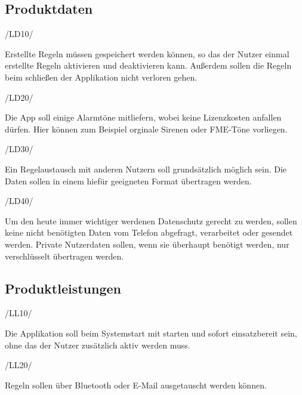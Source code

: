 \subsection{Produktdaten}
\begin{minipage}{3cm}
/LD10/
\end{minipage}
\begin{minipage}{13cm}
Erstellte Regeln m\"ussen gespeichert werden k\"onnen, so das der Nutzer einmal erstellte Regeln aktivieren und deaktivieren kann. Au\ss{}erdem sollen die Regeln beim schlie\ss{}en der Applikation nicht verloren gehen.\\
\end{minipage}
\begin{minipage}{3cm}
/LD20/
\end{minipage}
\begin{minipage}{13cm}
Die App soll einige Alarmt\"one mitliefern, wobei keine Lizenzkosten anfallen d\"urfen. Hier k\"onnen zum Beispiel orginale Sirenen oder \ac{FME}-T\"one vorliegen.\\
\end{minipage}
\begin{minipage}{3cm}
/LD30/
\end{minipage}
\begin{minipage}{13cm}
Ein Regelaustausch mit anderen Nutzern soll grunds\"atzlich m\"oglich sein. Die Daten sollen in einem hief\"ur geeigneten Format \"ubertragen werden.\\
\end{minipage}
\begin{minipage}{3cm}
/LD40/
\end{minipage}
\begin{minipage}{13cm}
Um den heute immer wichtiger werdenen Datenschutz gerecht zu werden, sollen keine nicht ben\"otigten Daten vom Telefon abgefragt, verarbeitet oder gesendet werden. Private Nutzerdaten sollen, wenn sie \"uberhaupt ben\"otigt werden, nur verschl\"usselt \"ubertragen werden.\\
\end{minipage}

\subsection{Produktleistungen}
\begin{minipage}{3cm}
/LL10/
\end{minipage}
\begin{minipage}{13cm}
Die Applikation soll beim Systemstart mit starten und sofort einsatzbereit sein, ohne das der Nutzer zus\"atzlich aktiv werden muss.\\
\end{minipage}
\begin{minipage}{3cm}
/LL20/
\end{minipage}
\begin{minipage}{13cm}
Regeln sollen \"uber Bluetooth oder E-Mail ausgetauscht werden k\"onnen.\\
\end{minipage}
